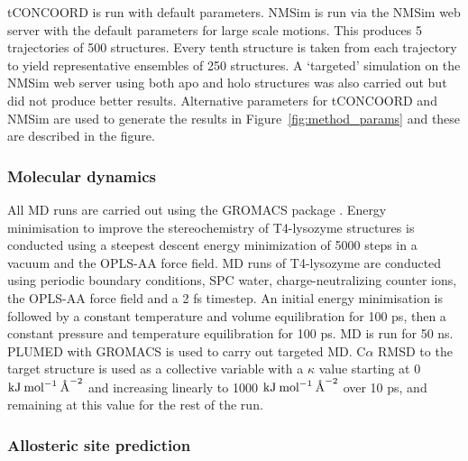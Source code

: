 tCONCOORD \cite{Seeliger2007} is run with default parameters.
NMSim is run via the NMSim web server \cite{Kruger2012} with the default parameters for large scale motions.
This produces 5 trajectories of 500 structures. Every tenth structure is taken from each trajectory to yield representative ensembles of 250 structures.
A `targeted' simulation on the NMSim web server using both apo and holo structures was also carried out but did not produce better results.
Alternative parameters for tCONCOORD and NMSim are used to generate the results in Figure~\ref{fig:method_params} and these are described in the figure.


\subsubsection{Molecular dynamics}

All MD runs are carried out using the GROMACS package \cite{Abraham2015}.
Energy minimisation to improve the stereochemistry of T4-lysozyme structures is conducted using a steepest descent energy minimization of 5000 steps in a vacuum and the OPLS-AA force field.
MD runs of T4-lysozyme are conducted using periodic boundary conditions, SPC water, charge-neutralizing counter ions, the OPLS-AA force field and a 2 fs timestep.
An initial energy minimisation is followed by a constant temperature and volume equilibration for 100 ps, then a constant pressure and temperature equilibration for 100 ps.
MD is run for 50 ns.
PLUMED \cite{Tribello2014} with GROMACS is used to carry out targeted MD.
C$\alpha$ RMSD to the target structure is used as a collective variable with a $\kappa$ value starting at 0 $\textup{kJ} \: \textup{mol}^{-1} \: \textup{\AA}^{-2}$ and increasing linearly to 1000 $\textup{kJ} \: \textup{mol}^{-1} \: \textup{\AA}^{-2}$ over 10 ps, and remaining at this value for the rest of the run.


\subsubsection{Allosteric site prediction}

